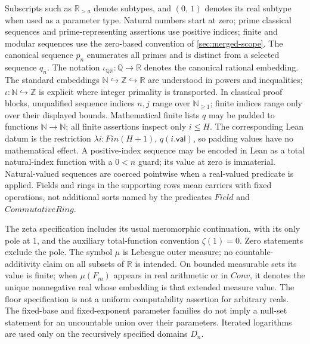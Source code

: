 \documentclass[11pt,reqno]{amsart}
\makeatletter
\newcommand{\N}{\mathbb N}
\newcommand{\Z}{\mathbb Z}
\newcommand{\Q}{\mathbb Q}
\newcommand{\R}{\mathbb R}
\newcommand{\Np}{\N_{\ge1}}
\theoremstyle{blueplain}
\newcounter{type}
\newcounter{asser}
\newcommand{\defref}[1]{\hyperref[#1]{Definition~\ref*{#1}}}
\providecommand{\comma}{\allowbreak,\,}
\numberwithin{equation}{section}
\DeclareRobustCommand{\defref}[1]{%
  \hyperlink{def:#1}{\ensuremath{\csname PredicateName@#1\endcsname}}}
\def\defref#1{#1}%
\def\hyperlink#1#2{#2}}
\makeatother
\begin{document}
Subscripts such as \(\R_{>a}\) denote subtypes, and \((0\comma 1)\) denotes its real
subtype when used as a parameter type. Natural numbers start at zero; prime
classical sequences and prime-representing assertions use positive indices;
finite and modular sequences use the zero-based convention of \cref{sec:merged-scope}. The canonical
sequence \(p_n\) enumerates all primes and is distinct from a selected sequence
\(q_n\). The notation $\iota_{\Q\R}:\Q\to\R$ denotes the canonical rational embedding. The standard embeddings \(\N\hookrightarrow\Z\hookrightarrow\R\)
are understood in powers and inequalities; \(\iota:\N\hookrightarrow\Z\)
is explicit where integer primality is transported. In classical proof blocks,
unqualified sequence indices \(n,j\) range over \(\Np\); finite indices
range only over their displayed bounds. Mathematical finite lists $q$ may
be padded to functions $\N\to\N$; all finite assertions inspect only
$i\le H$. The corresponding Lean datum is the restriction
$\lambda i:\defref{Fin}(H+1),\,q(i.\textsf{val})$, so padding values
have no mathematical effect. A positive-index sequence may be
encoded in Lean as a total natural-index function with a \(0<n\) guard;
its value at zero is immaterial. Natural-valued sequences are coerced
pointwise when a real-valued predicate is applied. Fields and rings in the
supporting rows mean carriers with fixed operations, not additional sorts
named by the predicates \(\defref{Field}\) and \(\defref{CommutativeRing}\).

The zeta specification includes its usual meromorphic continuation, with its
only pole at \(1\), and the auxiliary total-function convention \(\zeta(1)=0\).
Zero statements exclude the pole. The symbol \(\mu\) is Lebesgue outer measure;
no countable-additivity claim on all subsets of \(\R\) is intended.
On bounded measurable sets its value is finite; when \(\mu(F_m)\)
appears in real arithmetic or in \(\defref{Conv}\), it denotes the unique
nonnegative real whose embedding is that extended measure value. The floor
specification is not a uniform computability assertion for arbitrary reals.
The fixed-base and fixed-exponent parameter families do not imply a null-set
statement for an uncountable union over their parameters. Iterated logarithms
are used only on the recursively specified domains \(D_n\).

\label{sec:defs-prim-types}
\label{sec:defs-prim-ops}
\label{sec:defs-prim-pred}
\label{sec:defs-mills}
\label{sec:defs-kanw}
\label{sec:defs-ore}
\label{sec:defs-polygap}
\label{sec:defs-rm}
\label{sec:defs-theta}
\label{sec:defs-iter}
\end{document}
